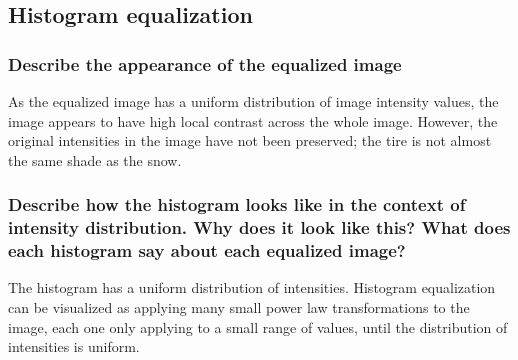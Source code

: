 \documentclass[article, 1.5space, letterpaper, 12pt, oneside, header, footer]{SydeClass}
\begin{document}
\subsection{Histogram equalization}


\begin{figure}[ht]
\centering
\end{figure}

\subsubsection{Describe the appearance of the equalized image}

As the equalized image has a uniform distribution of image intensity values, the image appears to have high local contrast across the whole image. However, the original intensities in the image have not been preserved; the tire is not almost the same shade as the snow.

\subsubsection{Describe how the histogram looks like in the context of intensity distribution. Why does it look like this? What does each histogram say about each equalized image?}

The histogram has a uniform distribution of intensities. Histogram equalization can be visualized as applying many small power law transformations to the image, each one only applying to a small range of values, until the distribution of intensities is uniform. 
\end{document}
